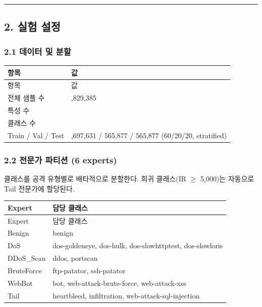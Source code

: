 \medskip\hrule\medskip
\subsection{2. 실험 설정}
\subsubsection{2.1 데이터 및 분할}
\begingroup
\footnotesize
\begin{longtable}{>{\raggedright\arraybackslash}p{}>{\raggedleft\arraybackslash}p{}}
\toprule
항목 & 값 \\ \midrule
\endfirsthead
항목 & 값 \\ \midrule
\endhead
{}전체 샘플 수 & 2,829,385 \\
{}특성 수 & 70 \\
{}클래스 수 & 15 \\
{}Train /\allowbreak{} Val /\allowbreak{} Test & 1,697,631 /\allowbreak{} 565,877 /\allowbreak{} 565,877 (60/\allowbreak{}20/\allowbreak{}20, stratified) \\
\bottomrule
\end{longtable}
\endgroup
\subsubsection{2.2 전문가 파티션 (6 experts)}
클래스를 공격 유형별로 배타적으로 분할한다. 희귀 클래스(IR \ensuremath{\geq} 5,000)는 자동으로 Tail 전문가에 할당된다.

\begingroup
\footnotesize
\begin{longtable}{>{\raggedright\arraybackslash}p{}>{\raggedright\arraybackslash}p{}}
\toprule
Expert & 담당 클래스 \\ \midrule
\endfirsthead
Expert & 담당 클래스 \\ \midrule
\endhead
{}Benign & benign \\
{}DoS & dos-goldeneye, dos-hulk, dos-slowhttptest, dos-slowloris \\
{}DDoS\_\allowbreak{}Scan & ddos, portscan \\
{}BruteForce & ftp-patator, ssh-patator \\
{}WebBot & bot, web-attack-brute-force, web-attack-xss \\
{}Tail & heartbleed, infiltration, web-attack-sql-injection \\
\bottomrule
\end{longtable}
\endgroup
